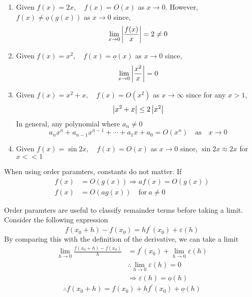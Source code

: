 \documentclass{article}
\begin{document}
\begin{eg}\leavevmode
    \begin{enumerate}
        \item Given $f(x) = 2x, \quad f(x) = O(x)$ as $x \rightarrow 0$. However, $f(x) \neq \underline{o}(g(x))$ as $x \rightarrow 0$ since,
        \[
            \lim_{x \rightarrow 0}{\left\lvert \frac{f(x)}{x}\right\rvert} = 2 \neq 0  
        \]
        \item Given $f(x) = x^2, \quad f(x) = \underline{o}(x)$ as $x \rightarrow 0$ since, 
        \[
            \lim_{x \rightarrow 0}{\left\lvert \frac{x^2}{x}\right\rvert} = 0
        \]
        \item Given $f(x) = x^2 + x, \quad f(x) = O(x^2)$ as $x \rightarrow \infty$ since for any $x > 1$,
        \[
            \left\lvert x^2 + x\right\rvert \leq 2\left\lvert x^2\right\rvert  
        \]
        In general, any polynomial where $a_n \neq 0$
        \[
            a_nx^n + a_{n-1}x^{n-1} + \cdots + a_1x + a_0 = O(x^n) \quad \text{as} \quad x \rightarrow 0
        \]
        \item Given $f(x) = \sin{2x}, \quad f(x) = O(x)$ as $x \rightarrow 0$ since, $\sin{2x} \approx 2x$ for $x << 1$
    \end{enumerate}
\end{eg}

\begin{remark}
    When using order paramters, constants do not matter. If 
    \begin{align*}
        f(x) &= O(g(x)) \Rightarrow af(x) = O(g(x)) \\
        f(x) &= O(ag(x)) \quad \text{for} \ a \neq 0
    \end{align*}
\end{remark}

Order paramters are useful to classify remainder terms before taking a limit. Consider the following expression
\[
    f(x_0 + h) - f(x_0) = h f^{\prime}(x_0) + \varepsilon(h) 
\]
By comparing this with the definition of the derivative, we can take a limit
\begin{align*}
    \lim_{h \rightarrow 0}{\frac{f(x_0 + h) - f(x_0)}{h}} &= f^{\prime}(x_0) + \lim_{h \rightarrow 0}{\varepsilon(h)} \\
    &\therefore  \lim_{h \rightarrow 0}{\varepsilon(h)} = 0 \\
    &\Rightarrow \varepsilon(h) = \underline{o}(h)
\end{align*}
\[
    \therefore f(x_0 + h) = f(x_0) + h f^{\prime}(x_0) + \underline{o}(h)
\]

\end{document}
